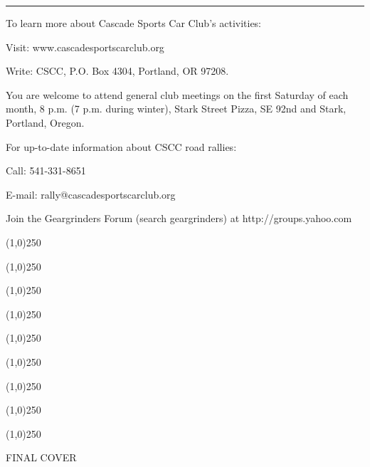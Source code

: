 \documentclass[letterpaper,9pt]{article}
\newcommand{\tinyitem}[1]{
  {\footnotesize \item #1}
}
\newcommand{\myline}{
  \par
  \kern3pt %
  \hrule height 1pt %
  \kern3pt %
}
\begin{document}
\myline

{\small
To learn more about Cascade Sports Car Club's activities:
\begin{itemize}
  \tinyitem {Visit: www.cascadesportscarclub.org}
  \tinyitem {Write: CSCC, P.O. Box 4304, Portland, OR 97208.}
\end{itemize}

You are welcome to attend general club meetings on the first Saturday of each month, 8 p.m. (7 p.m. during winter), Stark Street Pizza, SE 92nd and Stark, Portland, Oregon.

For up-to-date information about CSCC road rallies:
\begin{itemize}
  \tinyitem {Call: 541-331-8651}
  \tinyitem {E-mail: rally@cascadesportscarclub.org}
  \tinyitem {Join the Geargrinders Forum (search geargrinders) at http://groups.yahoo.com}
\end{itemize}
}


\cleardoublepage


\tableofcontents

\cleardoublepage

\pagestyle{plain}


\begin{center}
\line(1,0){250}
\end{center}


\begin{center}
\line(1,0){250}
\end{center}


\begin{center}
\line(1,0){250}
\end{center}


\begin{center}
\line(1,0){250}
\end{center}


\begin{center}
\line(1,0){250}
\end{center}


\begin{center}
\line(1,0){250}
\end{center}



\begin{center}
\line(1,0){250}
\end{center}


\begin{center}
\line(1,0){250}
\end{center}


\begin{center}
\line(1,0){250}
\end{center}


\newpage

\begin{titlepage}
FINAL COVER
\end{titlepage}
\end{document}
